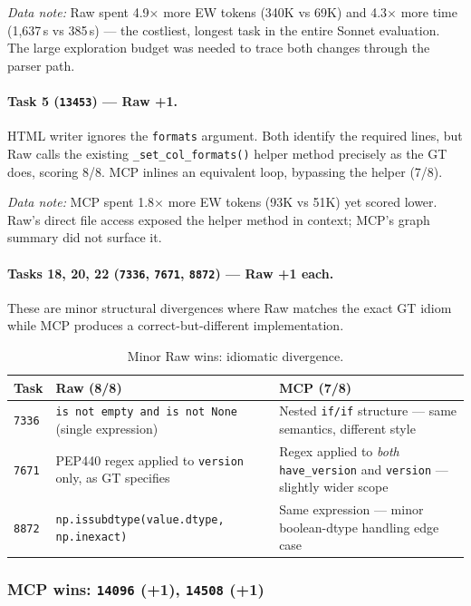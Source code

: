 \emph{Data note:} Raw spent 4.9$\times$ more EW tokens (340K vs 69K)
and 4.3$\times$ more time (1{,}637\,s vs 385\,s) --- the costliest,
longest task in the entire Sonnet evaluation.
The large exploration budget was needed to trace both changes through
the parser path.

\paragraph{Task 5 (\texttt{13453}) --- Raw +1.}
HTML writer ignores the \texttt{formats} argument.
Both identify the required lines, but Raw calls the existing
\texttt{\_set\_col\_formats()} helper method precisely as the GT
does, scoring 8/8.
MCP inlines an equivalent loop, bypassing the helper (7/8).

\emph{Data note:} MCP spent 1.8$\times$ more EW tokens (93K vs 51K)
yet scored lower.
Raw's direct file access exposed the helper method in context; MCP's
graph summary did not surface it.

\paragraph{Tasks 18, 20, 22 (\texttt{7336}, \texttt{7671}, \texttt{8872}) --- Raw +1 each.}
These are minor structural divergences where Raw matches the exact GT
idiom while MCP produces a correct-but-different implementation.

\begin{table}[h]
\centering
\caption{Minor Raw wins: idiomatic divergence.}\label{tab:minor-raw}
\begin{tabular}{lp{5.5cm}p{5cm}}
\toprule
\textbf{Task} & \textbf{Raw (8/8)} & \textbf{MCP (7/8)} \\
\midrule
\texttt{7336} & \texttt{is not empty and is not None} (single expression) & Nested \texttt{if/if} structure --- same semantics, different style \\
\texttt{7671} & PEP440 regex applied to \texttt{version} only, as GT specifies & Regex applied to \emph{both} \texttt{have\_version} and \texttt{version} --- slightly wider scope \\
\texttt{8872} & \texttt{np.issubdtype(value.dtype, np.inexact)} & Same expression --- minor boolean-dtype handling edge case \\
\bottomrule
\end{tabular}
\end{table}

\subsubsection{MCP wins: \texttt{14096} (+1), \texttt{14508} (+1)}

